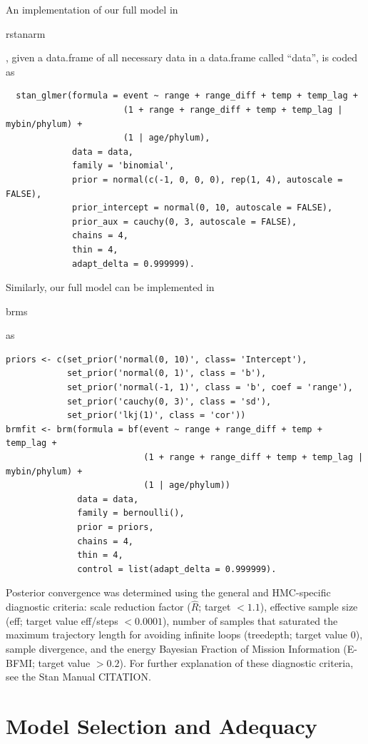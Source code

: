 \documentclass[12pt,letterpaper]{article}
\begin{document}
An implementation of our full model in \begin{texttt}rstanarm\end{texttt}, given a data.frame of all necessary data in a data.frame called ``data'', is coded as
\begin{verbatim}
  stan_glmer(formula = event ~ range + range_diff + temp + temp_lag + 
                       (1 + range + range_diff + temp + temp_lag | mybin/phylum) + 
                       (1 | age/phylum), 
             data = data, 
             family = 'binomial',
             prior = normal(c(-1, 0, 0, 0), rep(1, 4), autoscale = FALSE), 
             prior_intercept = normal(0, 10, autoscale = FALSE), 
             prior_aux = cauchy(0, 3, autoscale = FALSE), 
             chains = 4,
             thin = 4,
             adapt_delta = 0.999999).
\end{verbatim}

Similarly, our full model can be implemented in \begin{texttt}brms\end{texttt} as
\begin{verbatim}
priors <- c(set_prior('normal(0, 10)', class= 'Intercept'),
            set_prior('normal(0, 1)', class = 'b'),
            set_prior('normal(-1, 1)', class = 'b', coef = 'range'),
            set_prior('cauchy(0, 3)', class = 'sd'),
            set_prior('lkj(1)', class = 'cor'))
brmfit <- brm(formula = bf(event ~ range + range_diff + temp + temp_lag +
                           (1 + range + range_diff + temp + temp_lag | mybin/phylum) +
                           (1 | age/phylum))
              data = data, 
              family = bernoulli(), 
              prior = priors,
              chains = 4, 
              thin = 4,
              control = list(adapt_delta = 0.999999).
\end{verbatim}

Posterior convergence was determined using the general and HMC-specific diagnostic criteria: scale reduction factor (\(\hat{R}\); target \(<1.1\)), effective sample size (eff; target value eff/steps \(<0.0001\)), number of samples that saturated the maximum trajectory length for avoiding infinite loops (treedepth; target value 0), sample divergence, and the energy Bayesian Fraction of Mission Information (E-BFMI; target value \(>0.2\)). For further explanation of these diagnostic criteria, see the Stan Manual CITATION.


\section{Model Selection and Adequacy}
\end{document}
